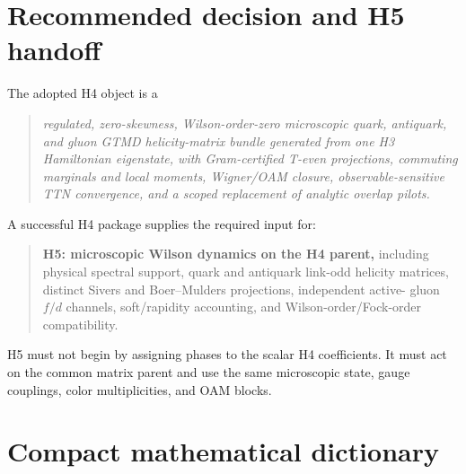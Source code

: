 \documentclass[11pt]{article}
\begin{document}
\section{Recommended decision and H5 handoff}
\label{sec:decision}

The adopted H4 object is a
\begin{quote}
\emph{regulated, zero-skewness, Wilson-order-zero microscopic quark,
antiquark, and gluon GTMD helicity-matrix bundle generated from one H3
Hamiltonian eigenstate, with Gram-certified T-even projections, commuting
marginals and local moments, Wigner/OAM closure, observable-sensitive TTN
convergence, and a scoped replacement of analytic overlap pilots.}
\end{quote}

A successful H4 package supplies the required input for:
\begin{quote}
\textbf{H5: microscopic Wilson dynamics on the H4 parent,}
including physical spectral support, quark and antiquark link-odd helicity
matrices, distinct Sivers and Boer--Mulders projections, independent active-
gluon \(f/d\) channels, soft/rapidity accounting, and Wilson-order/Fock-order
compatibility.
\end{quote}
H5 must not begin by assigning phases to the scalar H4 coefficients.  It must
act on the common matrix parent and use the same microscopic state, gauge
couplings, color multiplicities, and OAM blocks.

\appendix

\section{Compact mathematical dictionary}
\end{document}
